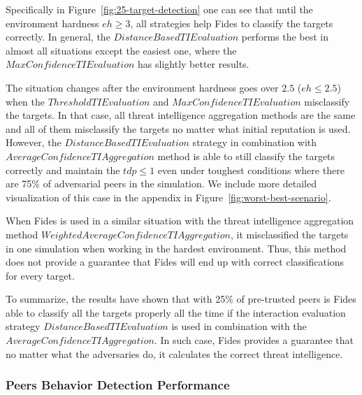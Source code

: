Specifically in Figure~\ref{fig:25-target-detection} one can see that until the environment hardness $eh \geq 3$, all strategies help Fides to classify the targets correctly.
In general, the $DistanceBasedTIEvaluation$ performs the best in almost all situations except the easiest one, where the $MaxConfidenceTIEvaluation$ has slightly better results.

The situation changes after the environment hardness goes over $2.5$ ($eh \leq 2.5$) when the $ThresholdTIEvaluation$ and $MaxConfidenceTIEvaluation$ misclassify the targets. In that case, all threat intelligence aggregation methods are the same and all of them misclassify the targets no matter what initial reputation is used.
However, the $DistanceBasedTIEvaluation$ strategy in combination with $AverageConfidenceTIAggregation$ method is able to still classify the targets correctly and maintain the $tdp \leq 1$ even under toughest conditions where there are 75\% of adversarial peers in the simulation. 
We include more detailed visualization of this case in the appendix in Figure~\ref{fig:worst-best-scenario}.

When Fides is used in a similar situation with the threat intelligence aggregation method $WeightedAverageConfidenceTIAggregation$, it misclassified the targets in one simulation when working in the hardest environment.
Thus, this method does not provide a guarantee that Fides will end up with correct classifications for every target.

To summarize, the results have shown that with 25\% of pre-trusted peers is Fides able to classify all the targets properly all the time if the interaction evaluation strategy $DistanceBasedTIEvaluation$ is used in combination with the $AverageConfidenceTIAggregation$. In such case, Fides provides a guarantee that no matter what the adversaries do, it calculates the correct threat intelligence.

\cleartoleftpage
\subsubsection{Peers Behavior Detection Performance}

